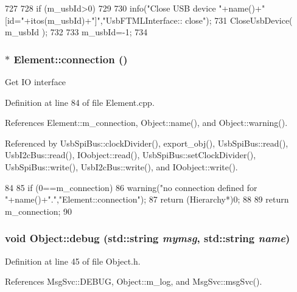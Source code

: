 \begin{DoxyCode}
727                                {
728   if (m_usbId>0)
729   {    
730     info("Close USB device "+name()+" [id="+itos(m_usbId)+"]","UsbFTMLInterface::
      close");
731     CloseUsbDevice( m_usbId );
732   }
733   m_usbId=-1;
734 }
\end{DoxyCode}
\hypertarget{classElement_af57444353c1ddf9fa0109801e97debf7}{
\subsubsection[{connection}]{ $\ast$ Element::connection ()}}
\label{classElement_af57444353c1ddf9fa0109801e97debf7}
Get IO interface 

Definition at line 84 of file Element.cpp.

References Element::m\_\-connection, Object::name(), and Object::warning().

Referenced by UsbSpiBus::clockDivider(), export\_\-obj(), UsbSpiBus::read(), UsbI2cBus::read(), IOobject::read(), UsbSpiBus::setClockDivider(), UsbSpiBus::write(), UsbI2cBus::write(), and IOobject::write().


\begin{DoxyCode}
84                               {
85   if (0==m_connection){
86     warning("no connection defined for "+name()+".","Element::connection");
87     return (Hierarchy*)0;
88   }
89   return m_connection;
90 }
\end{DoxyCode}
\hypertarget{classObject_a6c9a0397ca804e04d675ed05683f5420}{
\subsubsection[{debug}]{\setlength{\rightskip}{0pt plus 5cm}void Object::debug (std::string {\em mymsg}, \/  std::string {\em name})}}
\label{classObject_a6c9a0397ca804e04d675ed05683f5420}


Definition at line 45 of file Object.h.

References MsgSvc::DEBUG, Object::m\_\-log, and MsgSvc::msgSvc().


